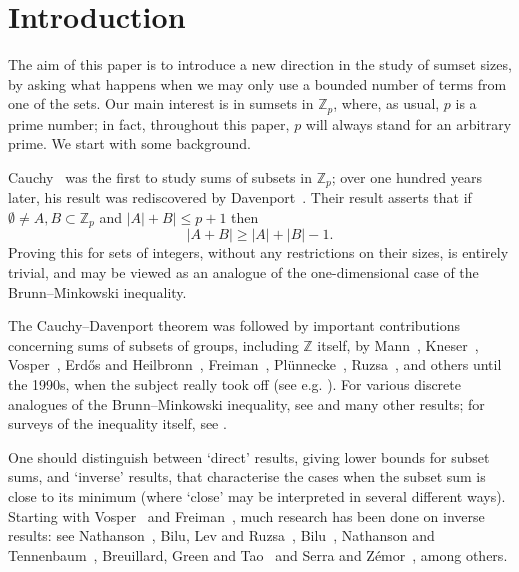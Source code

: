 \documentclass[12pt,reqno]{amsart}
\theoremstyle{definition}
\renewcommand\le{\leqslant}
\renewcommand\ge{\geqslant}
\begin{document}
\maketitle

\section{Introduction}\label{intro}


The aim of this paper is to introduce a new direction in the study of sumset sizes, by asking what
happens when we may only use a bounded number of terms from one of the sets. Our main interest is in
sumsets in ${\mathbb Z}_p$, where, as usual, $p$ is a prime number; in fact, throughout
this paper, $p$ will always stand for an arbitrary prime. We start with some
background.

\vspace{5pt}
Cauchy~\cite{Cauchy} was the first to study sums of subsets in ${\mathbb Z}_p$;
over one hundred years later, his result was rediscovered by
Davenport~\cite{Dav1, Dav2}. Their result asserts that if $\emptyset \ne A, B \subset {\mathbb Z}_p$ and
$|A|+B|\le p+1$ then
\begin{equation}\label{BM1}
|A+B|\ge |A|+|B|-1.
\end{equation}
Proving this for sets of integers, without any restrictions on their sizes, is entirely trivial,
and may be viewed as an analogue of the one-dimensional case of the Brunn--Minkowski inequality.



\vspace{5pt}
The Cauchy--Davenport theorem was followed by important
contributions concerning sums of subsets of groups, including ${\mathbb Z}$ itself, by
Mann~\cite{Mann1, Mann2}, Kneser~\cite{Knes}, Vosper~\cite{Vosp1, Vosp2}, Erd\H{o}s and
Heilbronn~\cite{ErdHeil}, Freiman~\cite{Frei-59, Frei-62, Frei-book}, Pl\"unnecke~\cite{Plu-70},
Ruzsa~\cite{Ruz-89}, and others until the 1990s,
when the subject really took off (see e.g. \cite{BSZ, BaBo, GyarMatRu, LevSme, Petr, Ruz-triangle-96, SerZem,
Stan, tao}). For various discrete analogues of the Brunn--Minkowski inequality, see
\cite{BoLe, BoLe-96, GarGro, GonHen, GreenTao, HerIgYep, IgYepZva}  and many other results;
for surveys of the inequality itself, see \cite{Bar, Gard}.

\vspace{5pt}
One should distinguish between `direct' results, giving lower bounds for subset sums, and `inverse'
results, that characterise the cases when the subset sum is close to its minimum (where `close' may be interpreted in
several different ways). Starting with Vosper~\cite{Vosp1}  and Freiman~\cite{Frei-59, Frei-62, Frei-book, Frei-87}, much research has been done on inverse results: see Nathanson~\cite{Nath-first-inverse, Nath-inverse, Nathbook}, Bilu, Lev and Ruzsa~\cite{biluzp}, Bilu~\cite{Bilu}, Nathanson and Tennenbaum~\cite{NathTen}, Breuillard, Green and Tao~\cite{BGT-doubling} and Serra and Z\'emor~\cite{SerZem}, among others.
\end{document}
